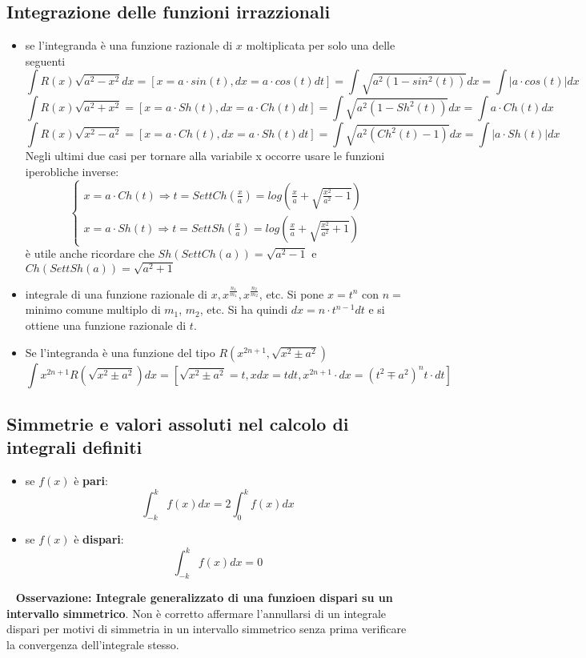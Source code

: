 \subsection{Integrazione delle funzioni irrazzionali}
\begin{itemize}
    \item se l'integranda è una funzione razionale di $x$ moltiplicata per solo una delle seguenti
    \[
        \int R(x) \sqrt{a^2-x^2} dx = [x=a \cdot  sin(t), dx =a \cdot  cos(t)dt] = \int \sqrt{a^2(1-sin^2(t))}dx = \int|a \cdot  cos(t)|dx
    \]
    \[
        \int R(x) \sqrt{a^2 + x^2} = [x=a \cdot  Sh(t), dx =a \cdot  Ch(t)dt] = \int \sqrt{a^2(1-Sh^2(t))}dx = \int a \cdot  Ch(t)dx
    \]
    \[
        \int R(x) \sqrt{x^2 -a^2} = [x=a \cdot  Ch(t), dx =a \cdot Sh(t)dt] = \int \sqrt{a^2(Ch^2(t)-1)}dx = \int|a \cdot Sh(t)|dx
    \]
    Negli ultimi due casi per tornare alla variabile x occorre usare le funzioni iperobliche inverse:
    \[
        \begin{cases}
            x = a \cdot  Ch(t) \Rightarrow t = SettCh(\frac{x}{a}) = log\left(\frac{x}{a}+\sqrt{\frac{x^2}{a^2}-1}\right)\\
            x= a \cdot Sh(t) \Rightarrow t = SettSh\left(\frac{x}{a}\right) = log\left(\frac{x}{a}+\sqrt{\frac{x^2}{a^2}+1}\right)
        \end{cases}
    \]
    è utile anche ricordare che $Sh(SettCh(a))= \sqrt{a^2-1}$ e $Ch(SettSh(a))=\sqrt{a^2+1}$
    \item integrale di una funzione razionale di $x, x^{\frac{n_1}{m_1}}, x^{\frac{n_2}{m_2}}$, etc. \newline
    Si pone $x = t^n$ con $n=$ minimo comune multiplo di $m_1$, $m_2$, etc. Si ha quindi $dx = n \cdot  t^{n-1} dt$ e si ottiene una funzione razionale di $t$.
    \item Se l'integranda è una funzione del tipo $R(x^{2n+1}, \sqrt{x^2 \pm a^2})$
    \[
        \int x^{2n+1}R(\sqrt{x^2 \pm a^2})dx = [\sqrt{x^2 \pm a^2} = t, xdx= tdt, x^{2n+1} \cdot dx = (t^2 \mp a^2)^n t \cdot  dt]
    \]
\end{itemize}
\subsection{Simmetrie e valori assoluti nel calcolo di integrali definiti}
\begin{itemize}
    \item se $f(x)$ è \textbf{pari}:
    \[
        \int_{-k}^{k}f(x)dx = 2 \int_{0}^{k} f(x) dx
    \]
    \item se $f(x)$ è \textbf{dispari}:
    \[
        \int_{-k}^{k}f(x)dx = 0
    \]
\end{itemize}
\ \newline
\textbf{Osservazione: Integrale generalizzato di una funzioen dispari su un intervallo simmetrico}.\newline
Non è corretto affermare l'annullarsi di un integrale dispari per motivi di simmetria in un intervallo simmetrico senza prima verificare la convergenza dell'integrale stesso.
